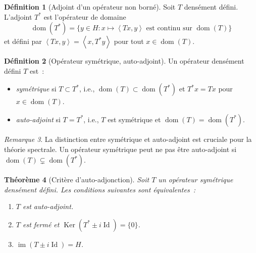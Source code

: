 \documentclass[a4paper,12pt]{book}
\DeclareMathOperator{\im}{im}
\DeclareMathOperator{\Id}{Id}
\DeclareMathOperator{\Ker}{Ker}
\DeclareMathOperator{\dom}{dom}
\newcommand{\inner}[2]{\left\langle #1, #2 \right\rangle}
\theoremstyle{definition}
\newtheorem{definition}{Définition}[chapter]
\theoremstyle{plain}
\newtheorem{theoreme}[definition]{Théorème}
\theoremstyle{remark}
\newtheorem{remarque}[definition]{Remarque}
\begin{document}
\begin{definition}[Adjoint d'un opérateur non borné]
\label{def:adjoint-non-borne}
Soit $T$ densément défini. L'adjoint $T^*$ est l'opérateur de domaine
\[
  \dom(T^*) = \{y \in H : x \mapsto \inner{Tx}{y} \text{ est continu sur } \dom(T)\}
\]
et défini par $\inner{Tx}{y} = \inner{x}{T^*y}$ pour tout $x \in \dom(T)$.
\end{definition}

\begin{definition}[Opérateur symétrique, auto-adjoint]
\label{def:symetrique-autoadjoint}
Un opérateur densément défini $T$ est~:
\begin{itemize}
  \item \emph{symétrique} si $T \subset T^*$, i.e., $\dom(T) \subset \dom(T^*)$ et
        $T^*x = Tx$ pour $x \in \dom(T)$.
  \item \emph{auto-adjoint} si $T = T^*$, i.e., $T$ est symétrique et
        $\dom(T) = \dom(T^*)$.
\end{itemize}
\end{definition}

\begin{remarque}
La distinction entre symétrique et auto-adjoint est cruciale pour la théorie spectrale.
Un opérateur symétrique peut ne pas être auto-adjoint si $\dom(T) \subsetneq \dom(T^*)$.
\end{remarque}

\begin{theoreme}[Critère d'auto-adjonction]
\label{thm:critere-autoadjoint}
Soit $T$ un opérateur symétrique densément défini. Les conditions suivantes sont
équivalentes~:
\begin{enumerate}[label=(\roman*)]
  \item $T$ est auto-adjoint.
  \item $T$ est fermé et $\Ker(T^* \pm i\Id) = \{0\}$.
  \item $\im(T \pm i\Id) = H$.
\end{enumerate}
\end{theoreme}
\end{document}
